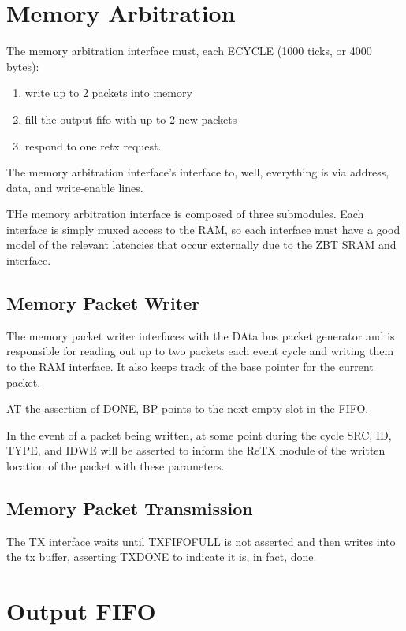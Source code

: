 \section{Memory Arbitration} 

The memory arbitration interface must, each ECYCLE (1000 ticks, or 4000 bytes):

\begin{enumerate}
\item write up to 2 packets into memory
\item fill the output fifo with up to 2 new packets
\item respond to one retx request. 
\end{enumerate}

The memory arbitration interface's interface to, well, everything is via address, data, and write-enable lines. 

THe memory arbitration interface is composed of three submodules. Each interface is simply muxed access to the RAM, so each interface must have a good model of the relevant latencies that occur externally due to the ZBT SRAM and interface. 


\subsection{Memory Packet Writer}
The memory packet writer interfaces with the DAta bus packet generator and is responsible for reading out up to two packets each event cycle and writing them 
to the RAM interface. It also keeps track of the base pointer for the current packet. 

AT the assertion of DONE, BP points to the next empty slot in the FIFO. 

In the event of a packet being written, at some point during the cycle SRC, ID, TYPE, and IDWE will be asserted to inform the ReTX module of the written location of the packet with these parameters. 

\subsection{Memory Packet Transmission} 
The TX interface waits until TXFIFOFULL is not asserted and then writes into the tx buffer, asserting TXDONE to indicate it is, in fact, done. 

\section{Output FIFO} 
